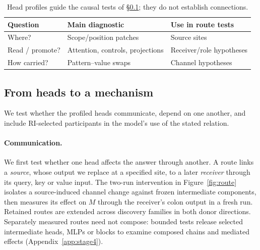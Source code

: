 \begin{table}[t]
\centering\small
\setlength{\tabcolsep}{3pt}
\begin{tabular}{@{}p{1.55cm}p{3.1cm}p{2.55cm}@{}}
\toprule
Question & Main diagnostic & Use in route tests \\
\midrule
Where? & Scope/position patches & Source sites \\
Read / promote? & Attention, controls, projections & Receiver/role hypotheses \\
How carried? & Pattern--value swaps & Channel hypotheses \\
\bottomrule
\end{tabular}
\caption{Head profiles guide the causal tests of
\S\ref{sec:method-circuits}; they do not establish connections.}
\label{tab:profile}
\end{table}

\subsection{From heads to a mechanism}
\label{sec:method-circuits}

We test whether the profiled heads communicate, depend on one another, and
include RI-selected participants in the model's use of the stated relation.

\paragraph{Communication.}
We first test whether one head affects the answer through another.
A route links a \emph{source}, whose output we replace at a specified site, to a
later \emph{receiver} through its query, key or value input.
The two-run intervention in Figure~\ref{fig:route} isolates a source-induced
channel change against frozen intermediate components, then measures its effect
on $M$ through the receiver's colon output in a fresh run. Retained routes are
extended across discovery families in both donor directions. Separately measured
routes need not compose: bounded tests release selected intermediate heads, MLPs
or blocks to examine composed chains and mediated effects
(Appendix~\ref{app:stage4}).

